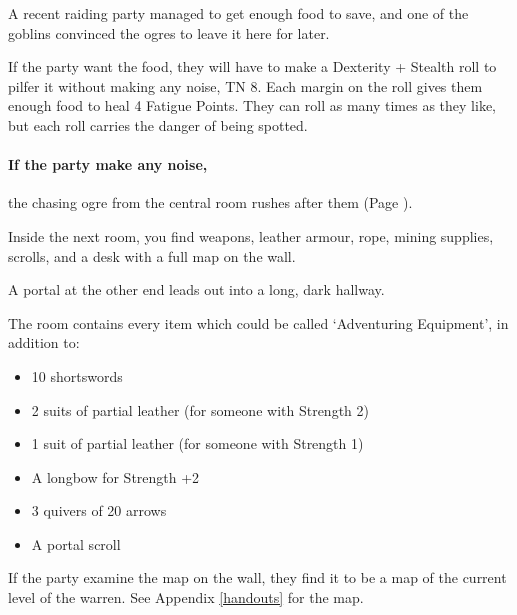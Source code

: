 \begin{multicols}{2}
\begin{boxtext}
\end{boxtext}

A recent raiding party managed to get enough food to save, and one of the goblins convinced the ogres to leave it here for later.

If the party want the food, they will have to make a Dexterity + Stealth roll to pilfer it without making any noise, TN 8.
Each margin on the roll gives them enough food to heal 4 Fatigue Points.
They can roll as many times as they like, but each roll carries the danger of being spotted.

\paragraph{If the party make any noise,}
the chasing ogre from the central room rushes after them (Page \pageref{chasingogre}).


\begin{boxtext}

	Inside the next room, you find weapons, leather armour, rope, mining supplies, scrolls, and a desk with a full map on the wall.

	A portal at the other end leads out into a long, dark hallway.

\end{boxtext}

The room contains every item which could be called `Adventuring Equipment',
\iftoggle{core}{%
\footnote{See the core book, page \pageref{start_equipment}}
}{}%
in addition to:

\begin{itemize}

	\item{10 shortswords}
	\item{2 suits of partial leather (for someone with Strength 2)}
	\item{1 suit of partial leather (for someone with Strength 1)}
	\item{A longbow for Strength +2}
	\item{3 quivers of 20 arrows}
	\item{A portal scroll}

\end{itemize}

If the party examine the map on the wall, they find it to be a map of the current level of the warren.
See Appendix \ref{handouts} for the map.



\end{multicols}
